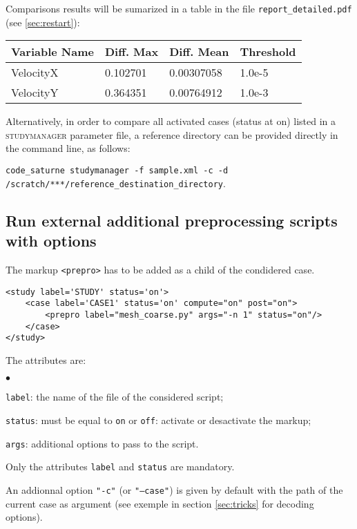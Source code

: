 \documentclass[a4paper,10pt,twoside]{csshortdoc}
\begin{document}
Comparisons results will be sumarized in a table in the file
\texttt{report\_detailed.pdf}  (see \ref{sec:restart}):

\begin{center}
\begin{longtable}{|l|l|l|l|}
\hline
\textbf{Variable Name} &\textbf{Diff. Max} &\textbf{Diff. Mean} &\textbf{Threshold} \\
\hline
\hline
VelocityX &0.102701 &0.00307058 &1.0e-5 \\
\hline
VelocityY &0.364351 &0.00764912 &1.0e-3 \\
\hline
\end{longtable}
\end{center}

Alternatively, in order to compare all activated cases (status at on) listed
in a \textsc{studymanager} parameter file, a reference directory can be provided
directly in the command line, as follows:

\texttt{code\_saturne studymanager -f sample.xml -c -d /scratch/***/reference\_destination\_directory}.

\subsection{Run external additional preprocessing scripts with options}\label{sec:prepro}

The markup \texttt{<prepro>} has to be added as a child of the condidered case.

\small
\begin{verbatim}
<study label='STUDY' status='on'>
    <case label='CASE1' status='on' compute="on" post="on">
        <prepro label="mesh_coarse.py" args="-n 1" status="on"/>
    </case>
</study>
\end{verbatim}
\normalsize

The attributes are:
\begin{list}{$\bullet$}{}
\item \texttt{label}: the name of the file of the considered script;
\item \texttt{status}: must be equal to \texttt{on} or \texttt{off}:
activate or desactivate the markup;
\item \texttt{args}: additional options to pass to the script.
\end{list}

Only the attributes \texttt{label} and \texttt{status} are mandatory.

An addionnal option \texttt{"-c"} (or \texttt{"--case"}) is given by
default with the path of the current case as argument (see exemple in
section \ref{sec:tricks} for decoding options).
\end{document}

